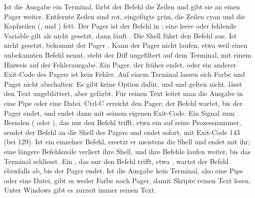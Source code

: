 Ist die Ausgabe ein Terminal, färbt der Befehl die Zeilen und gibt sie an einen Pager weiter.
Entfernte Zeilen sind rot, eingefügte grün, die Zeilen  cyan und die Kopfzeilen
(, \type{---} und \type{+++}) fett.
Der Pager ist der Befehl in ; eine leere oder fehlende Variable gilt als nicht
gesetzt, dann läuft . Die Shell führt den Befehl aus. Ist  nicht gesetzt,
bekommt der Pager . Kann der Pager nicht laufen, etwa weil  einen
unbekannten Befehl nennt, steht der Diff ungefiltert auf dem Terminal, mit einem Hinweis auf
der Fehlerausgabe.
Ein Pager, der früher endet, oder ein anderer Exit-Code des Pagers ist kein Fehler.
Auf einem Terminal lassen sich Farbe und Pager nicht abschalten: Es gibt keine Option dafür,
und  und  gelten nicht.  lässt den Text
ungeblättert, aber gefärbt. Für reinen Text leitet man die Ausgabe in eine Pipe oder eine Datei.
Ctrl-C erreicht den Pager; der Befehl wartet, bis der Pager endet,
und endet dann mit seinem eigenen Exit-Code.
Ein Signal zum Beenden ( oder ), das nur den Befehl trifft,
etwa ein  auf seine Prozessnummer, sendet der Befehl an die Shell des Pagers
und endet sofort, mit Exit-Code 143 (bei  129).
Ist  ein einzelner Befehl, ersetzt er meistens die Shell und endet mit ihr;
eine längere Befehlszeile verliert ihre Shell, und ihre Befehle laufen weiter,
bis das Terminal schliesst.
Ein , das nur den Befehl trifft, etwa , wartet der Befehl
ebenfalls ab, bis der Pager endet.
Ist die Ausgabe kein Terminal, also eine Pipe oder eine Datei, gibt es weder Farbe noch Pager,
damit Skripte reinen Text lesen. Unter Windows gibt es zurzeit immer reinen Text.

